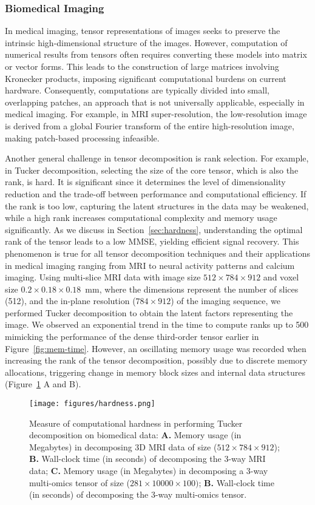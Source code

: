 \subsubsection{Biomedical Imaging}
In medical imaging, tensor representations of images seeks to preserve the intrinsic high-dimensional structure of the images. However, computation of numerical results from tensors often requires converting these models into matrix or vector forms. This leads to the construction of large matrices involving Kronecker products, imposing significant computational burdens on current hardware. Consequently, computations are typically divided into small, overlapping patches, an approach that is not universally applicable, especially in medical imaging. For example, in MRI super-resolution, the low-resolution image is derived from a global Fourier transform of the entire high-resolution image, making patch-based processing infeasible. 

Another general challenge in tensor decomposition is rank selection. For example, in Tucker decomposition, selecting the size of the core tensor, which is also the rank, is hard. It is significant since it determines the level of dimensionality reduction and the trade-off between performance and computational efficiency. If the rank is too low, capturing the latent structures in the data may be weakened, while a high rank increases computational complexity and memory usage significantly. As we discuss in Section~\ref{sec:hardness}, understanding the optimal rank of the tensor leads to a low MMSE, yielding efficient signal recovery. This phenomenon is true for all tensor decomposition techniques and their applications in medical imaging ranging from MRI to neural activity patterns and calcium imaging. Using multi-slice MRI data with image size $512\times784\times912$ and voxel size $0.2\times0.18\times0.18$~mm, where the dimensions represent the number of slices (512), and the in-plane resolution ($784\times912$) of the imaging sequence, we performed Tucker decomposition to obtain the latent factors representing the image. We observed an exponential trend in the time to compute ranks up to 500 mimicking the performance of the dense third-order tensor earlier in Figure~\ref{fig:mem-time}. However, an oscillating memory usage was recorded when increasing the rank of the tensor decomposition, possibly due to discrete memory allocations, triggering change in memory block sizes and internal data structures (Figure~\ref{fig:hardness} A and B). 

\begin{figure}[!htbp]
    \centering
    \texttt{[image: figures/hardness.png]}
    \caption{Measure of computational hardness in performing Tucker decomposition on biomedical data: \textbf{A.} Memory usage (in Megabytes) in decomposing 3D MRI data of size ($512 \times 784 \times 912$); \textbf{B.} Wall-clock time (in seconds) of decomposing the 3-way MRI data; \textbf{C.} Memory usage (in Megabytes) in decomposing a 3-way multi-omics tensor of size ($281 \times 10000 \times 100)$; \textbf{B.} Wall-clock time (in seconds) of decomposing the 3-way multi-omics tensor.}
    \label{fig:hardness}
\end{figure}

